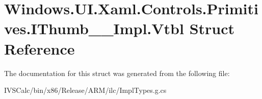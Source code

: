 \hypertarget{struct_windows_1_1_u_i_1_1_xaml_1_1_controls_1_1_primitives_1_1_i_thumb_____impl_1_1_vtbl}{}\section{Windows.\+U\+I.\+Xaml.\+Controls.\+Primitives.\+I\+Thumb\+\_\+\+\_\+\+Impl.\+Vtbl Struct Reference}
\label{struct_windows_1_1_u_i_1_1_xaml_1_1_controls_1_1_primitives_1_1_i_thumb_____impl_1_1_vtbl}


The documentation for this struct was generated from the following file\+:\begin{DoxyCompactItemize}
\item 
I\+V\+S\+Calc/bin/x86/\+Release/\+A\+R\+M/ilc/Impl\+Types.\+g.\+cs\end{DoxyCompactItemize}
